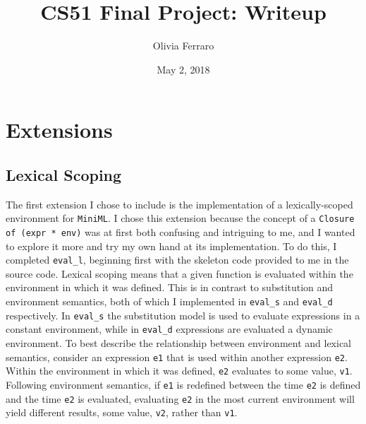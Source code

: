 \documentclass{report}
\title{\Huge CS51 Final Project: Writeup}
\author{\Large Olivia Ferraro }
\date{May 2, 2018}
\begin{document}
\maketitle

\section{Extensions}

\subsection{Lexical Scoping}
The first extension I chose to include is the implementation of a lexically-scoped environment for \texttt{MiniML}. I chose this extension because the concept of a \texttt{Closure of (expr * env)} was at first both confusing and intriguing to me, and I wanted to explore it more and try my own hand at its implementation. To do this, I completed \texttt{eval_l}, beginning first with the skeleton code provided to me in the source code. 
\newline \newline 
Lexical scoping means that a given function is evaluated within the environment in which it was defined. This is in contrast to substitution and environment semantics, both of which I implemented in \texttt{eval_s} and \texttt{eval_d} respectively. In \texttt{eval_s} the substitution model is used to evaluate expressions in a constant environment, while in \texttt{eval_d} expressions are evaluated a dynamic environment. 
\newline \newline 
To best describe the relationship between environment and lexical semantics, consider an expression \texttt{e1} that is used within another expression \texttt{e2}. Within the environment in which it was defined, \texttt{e2} evaluates to some value, \texttt{v1}. Following environment semantics, if \texttt{e1} is redefined between the time \texttt{e2} is defined and the time \texttt{e2} is evaluated, evaluating \texttt{e2} in the most current environment will yield different results, some value, \texttt{v2}, rather than \texttt{v1}.
\newline \newline
\end{document}
